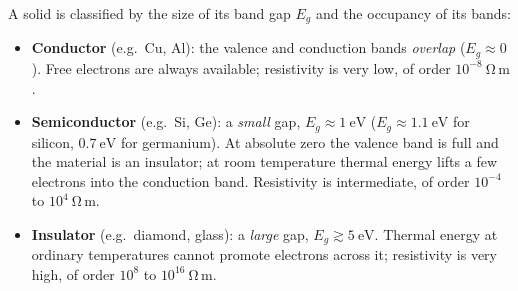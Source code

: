 \documentclass[11pt]{article}
\begin{document}
\begin{definition}
A solid is classified by the size of its band gap $E_g$ and the occupancy of its bands:
\begin{itemize}
\item \textbf{Conductor} (e.g.\ Cu, Al): the valence and conduction bands \emph{overlap} ($E_g \approx 0$). Free electrons are always available; resistivity is very low, of order $10^{-8}\ \mathrm{\Omega\,m}$.
\item \textbf{Semiconductor} (e.g.\ Si, Ge): a \emph{small} gap, $E_g \approx 1\ \mathrm{eV}$ ($E_g \approx 1.1\ \mathrm{eV}$ for silicon, $0.7\ \mathrm{eV}$ for germanium). At absolute zero the valence band is full and the material is an insulator; at room temperature thermal energy lifts a few electrons into the conduction band. Resistivity is intermediate, of order $10^{-4}$ to $10^{4}\ \mathrm{\Omega\,m}$.
\item \textbf{Insulator} (e.g.\ diamond, glass): a \emph{large} gap, $E_g \gtrsim 5\ \mathrm{eV}$. Thermal energy at ordinary temperatures cannot promote electrons across it; resistivity is very high, of order $10^{8}$ to $10^{16}\ \mathrm{\Omega\,m}$.
\end{itemize}
\end{definition}
\end{document}
